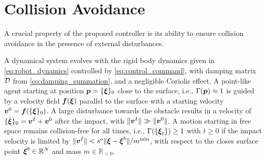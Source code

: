 \section{Collision Avoidance} \label{sec:collision_avoidance}

A crucial property of the proposed controller is its ability to ensure collision avoidance in the presence of external disturbances.



\begin{lemma}
	A dynamical system evolves with the rigid body dynamics given in \eqref{eq:robot_dynamics} controlled by \eqref{eq:control_command}, with damping matrix $\mathcal{D}$ from \eqref{eq:damping_summation}, and a negligible Coriolis effect.
    A point-like agent starting at position $\boldsymbol{p} = \{{\boldsymbol{\xi}}\}_0$ close to the surface, i.e., $\Gamma( \boldsymbol{p}) \approx 1$ is guided by a velocity field $\boldsymbol{f}(\boldsymbol{\xi})$ parallel to the surface with a starting velocity $\boldsymbol{v}^0= \boldsymbol{f}(\{{\boldsymbol{\xi}}\}_0)$.
    A large disturbance towards the obstacle results in a velocity of $\{\dot{\boldsymbol{\xi}}\}_0 = \boldsymbol{v}^I +  \boldsymbol{v}^0$ after the impact, with $\| \boldsymbol{v}^I \| \gg \| \boldsymbol{v}^0 \|$.
	A motion starting in free space remains collision-free for all times, i.e., $\Gamma( \{\boldsymbol{\xi}_t\}) \geq 1$ with $t \geq 0$ if the impact velocity is limited by $\| \boldsymbol{v}^I\| < s^{\mathrm{o}} \| \boldsymbol{\xi} - \boldsymbol{\xi}^b \| / m^{\mathrm{min}}$, with respect to the closes surface point $\boldsymbol{\xi}^b \in \mathbb{R}^N$ and mass $m \in \mathbb{R}_{>0}$.
\end{lemma}


